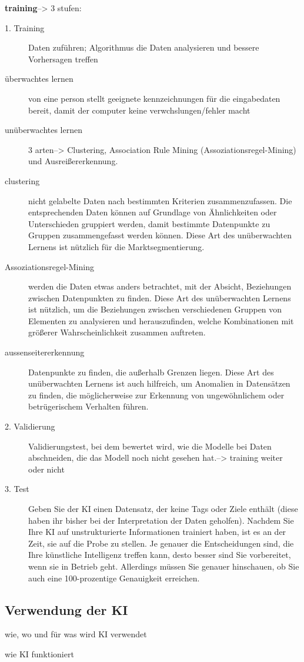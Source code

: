 \textbf{training}--> 3 stufen:
\begin{description}
    \item[1. Training] Daten zuführen; Algorithmus die Daten analysieren und bessere Vorhersagen treffen
    \item[überwachtes lernen] von eine person stellt geeignete kennzeichnungen für die eingabedaten bereit, damit der computer keine verwchslungen/fehler macht
    \item[unüberwachtes lernen] 3 arten--> Clustering, Association Rule Mining (Assoziationsregel-Mining) und Ausreißererkennung.
    \item[clustering]  nicht gelabelte Daten nach bestimmten Kriterien zusammenzufassen. Die entsprechenden Daten können auf Grundlage von Ähnlichkeiten oder Unterschieden gruppiert werden, damit  bestimmte Datenpunkte zu Gruppen zusammengefasst werden können. Diese Art des unüberwachten Lernens ist nützlich für die Marktsegmentierung.
    \item[Assoziationsregel-Mining]  werden die Daten etwas anders betrachtet, mit der Absicht, Beziehungen zwischen Datenpunkten zu finden. Diese Art des unüberwachten Lernens ist nützlich, um die Beziehungen zwischen verschiedenen Gruppen von Elementen zu analysieren und herauszufinden, welche Kombinationen mit größerer Wahrscheinlichkeit zusammen auftreten.
    \item[aussenseitererkennung] Datenpunkte zu finden, die außerhalb Grenzen liegen. Diese Art des unüberwachten Lernens ist auch hilfreich, um Anomalien in Datensätzen zu finden, die möglicherweise zur Erkennung von ungewöhnlichem oder betrügerischem Verhalten führen.
    \item[2. Validierung]Validierungstest, bei dem bewertet wird, wie die Modelle bei Daten abschneiden, die das Modell noch nicht gesehen hat.--> training weiter oder nicht
    \item[3. Test] Geben Sie der KI einen Datensatz, der keine Tags oder Ziele enthält (diese haben ihr bisher bei der Interpretation der Daten geholfen). Nachdem Sie Ihre KI auf unstrukturierte Informationen trainiert haben, ist es an der Zeit, sie auf die Probe zu stellen.
    Je genauer die Entscheidungen sind, die Ihre künstliche Intelligenz treffen kann, desto besser sind Sie vorbereitet, wenn sie in Betrieb geht. Allerdings müssen Sie genauer hinschauen, ob Sie auch eine 100-prozentige Genauigkeit erreichen.
    \end{description}


\bigskip

\subsection{Verwendung der KI}
wie, wo und für was wird KI verwendet

wie KI funktioniert
